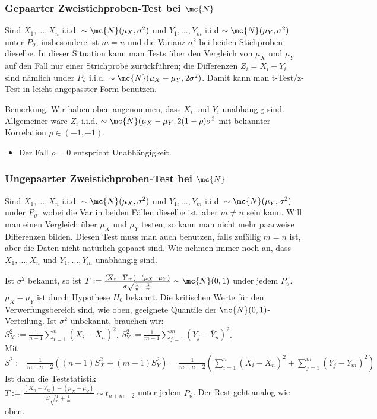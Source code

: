 \subsubsection{Gepaarter Zweistichproben-Test bei $\mc{N}$}
Sind $X_1, \dots, X_n$ i.i.d. $\sim \mc{N}(\mu_X, \sigma^2)$ und $Y_1, \dots, Y_m$ i.i.d $\sim \mc{N}(\mu_Y, \sigma^2)$ unter $P_\vartheta$; insbesondere ist $m = n$ und die Varianz $\sigma^2$ bei beiden Stichproben dieselbe. In dieser Situation kann man Tests über den Vergleich von $\mu_X$ und $\mu_Y$ auf den Fall nur einer Strichprobe zurückführen; die Differenzen $Z_i = X_i - Y_i$ sind nämlich under $P_\vartheta$ i.i.d. $\sim \mc{N}(\mu_X - \mu_Y, 2 \sigma^2)$. Damit kann man t-Test/z-Test in leicht angepasster Form benutzen.

Bemerkung: Wir haben oben angenommen, dass $X_i$ und $Y_i$ unabhängig sind. Allgemeiner wäre $Z_i$ i.i.d. $\sim \mc{N}(\mu_X - \mu_Y, 2 (1 - \rho)\sigma^2$ mit bekannter Korrelation $\rho \in (-1, +1)$.
    \begin{itemize}
        \item Der Fall $\rho = 0$ entspricht Unabhängigkeit.
    \end{itemize}

\subsubsection{Ungepaarter Zweistichproben-Test bei $\mc{N}$}
Sind $X_1, \dots, X_n$ i.i.d. $\sim \mc{N}(\mu_X, \sigma^2)$ und $Y_1, \dots, Y_m$ i.i.d. $\sim \mc{N}(\mu_Y, \sigma^2)$ under $P_\vartheta$, wobei die Var in beiden Fällen dieselbe ist, aber $m \neq n$ sein kann. Will man einen Vergleich über $\mu_X$ und $\mu_Y$ testen, so kann man nicht mehr paarweise Differenzen bilden. Diesen Test muss man auch benutzen, falls zufällig $m = n$ ist, aber die Daten nicht natürlich gepaart sind. Wie nehmen immer noch an, dass $X_1, \dots, X_n$ und $Y_1, \dots, Y_m$ unabhängig sind.
\begin{itemize}
     Ist $\sigma^2$ bekannt, so ist $T := \frac{(\overline{X}_n - \overline{Y}_m) - (\mu_X - \mu_Y)}{\sigma \sqrt{\frac{1}{n} + \frac{1}{m}}} \sim \mc{N}(0, 1)$ under jedem $P_\vartheta$. $\mu_X - \mu_Y$ ist durch Hypothese $H_0$ bekannt. Die kritischen Werte für den Verwerfungsbereich sind, wie oben, geeignete Quantile der $\mc{N}(0, 1)$-Verteilung.
     Ist $\sigma^2$ unbekannt, brauchen wir: \\
    $S_X^2:= \frac{1}{n - 1} \sum_{i=1}^{n}(X_i - \overline{X}_n)^2$,
    $S_Y^2:= \frac{1}{m - 1} \sum_{j=1}^{m}(Y_j - \overline{Y}_n)^2$. \\
    Mit $S^2 := \frac{1}{m + n - 2}((n - 1)S_X^2 + (m - 1)S_Y^2) = \frac{1}{m + n - 2} (\sum_{i=1}^{n} (X_i - \overline{X}_n)^2 + \sum_{j=1}^{m}(Y_j - \overline{Y}_m)^2)$\\
   Ist dann die Teststatistik\\
   $T := \frac{(\overline{X}_n - \overline{Y}_m) - (\mu_X - \mu_Y)}{S \sqrt{\frac{1}{n} + \frac{1}{m}}} \sim t_{n + m - 2}$ unter jedem $P_\vartheta$. Der Rest geht analog wie oben.
\end{itemize}

